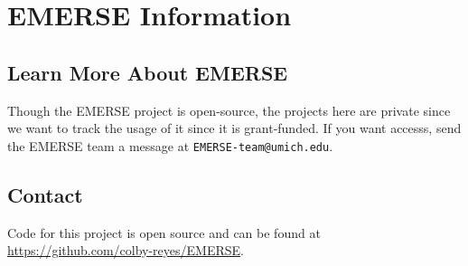 \chapter{EMERSE Information}


\section{Learn More About EMERSE}
\label{sec:emerse_info}


Though the EMERSE project is open-source, the projects here are private since we want to track the usage of it since it is grant-funded. If you want accesss, send the EMERSE team a message at \nolinkurl{EMERSE-team@umich.edu}.

\section{Contact}
\label{sec:emerse_contact}
Code for this project is open source and can be found at \url{https://github.com/colby-reyes/EMERSE}.


